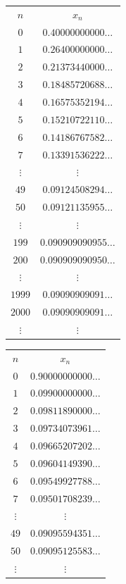 {\begin{table}
{\scriptsize
\begin{center}
\begin{tabular}{c|c}
\cline{1-2}
  $n$   &  $x_n$  \\ 
\cline{1-2}
$0$ & $0.40000000000\ldots$ \\ 
$1$ & $0.26400000000\ldots$ \\ 
$2$ & $0.21373440000\ldots$ \\ 
$3$ & $0.18485720688\ldots$ \\ 
$4$ & $0.16575352194\ldots$ \\ 
$5$ & $0.15210722110\ldots$ \\ 
$6$ & $0.14186767582\ldots$ \\ 
$7$ & $0.13391536222\ldots$ \\ 
$\vdots$ & $\vdots$ \\
$49$ & $0.09124508294\ldots$ \\ 
$50$ & $0.09121135955\ldots$ \\ 
$\vdots$ & $\vdots$ \\
$199$ & $0.090909090955\ldots$ \\
$200$ & $0.090909090950\ldots$ \\
$\vdots$ & $\vdots$ \\
$1999$ & $0.09090909091\ldots$ \\
$2000$ & $0.09090909091\ldots$ \\
$\vdots$ & $\vdots$ \\
\cline{1-2}
\end{tabular}
\qquad\qquad
\begin{tabular}{c|c}
\cline{1-2}
  $n$   &  $x_n$  \\ 
\cline{1-2}
$0$ & $0.90000000000\ldots$ \\ 
$1$ & $0.09900000000\ldots$ \\ 
$2$ & $0.09811890000\ldots$ \\ 
$3$ & $0.09734073961\ldots$ \\ 
$4$ & $0.09665207202\ldots$ \\ 
$5$ & $0.09604149390\ldots$ \\ 
$6$ & $0.09549927788\ldots$ \\ 
$7$ & $0.09501708239\ldots$ \\ 
$\vdots$ & $\vdots$ \\
$49$ & $0.09095594351\ldots$ \\ 
$50$ & $0.09095125583\ldots$ \\ 
$\vdots$ & $\vdots$ \\

\end{tabular}
\end{center}}
\end{table}}
